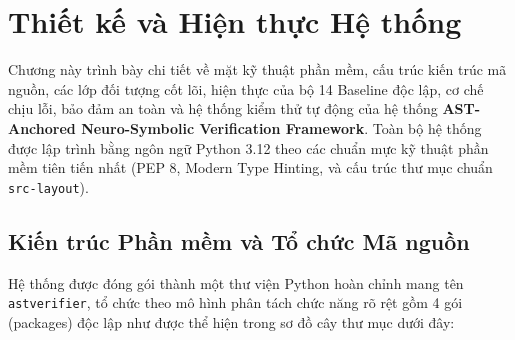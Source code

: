 \chapter{Thiết kế và Hiện thực Hệ thống}
\label{ch:implementation}

Chương này trình bày chi tiết về mặt kỹ thuật phần mềm, cấu trúc kiến trúc mã nguồn, các lớp đối tượng cốt lõi, hiện thực của bộ 14 Baseline độc lập, cơ chế chịu lỗi, bảo đảm an toàn và hệ thống kiểm thử tự động của hệ thống \textbf{AST-Anchored Neuro-Symbolic Verification Framework}. Toàn bộ hệ thống được lập trình bằng ngôn ngữ Python 3.12 theo các chuẩn mực kỹ thuật phần mềm tiên tiến nhất (PEP 8, Modern Type Hinting, và cấu trúc thư mục chuẩn \texttt{src-layout}).

\section{Kiến trúc Phần mềm và Tổ chức Mã nguồn}
\label{sec:software_architecture}

Hệ thống được đóng gói thành một thư viện Python hoàn chỉnh mang tên \texttt{astverifier}, tổ chức theo mô hình phân tách chức năng rõ rệt gồm 4 gói (packages) độc lập như được thể hiện trong sơ đồ cây thư mục dưới đây:

